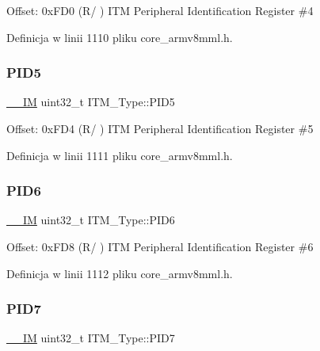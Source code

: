 Offset\+: 0x\+F\+D0 (R/ ) I\+TM Peripheral Identification Register \#4 

Definicja w linii 1110 pliku core\+\_\+armv8mml.\+h.

\mbox{\label{struct_i_t_m___type_af9085648bf18f69b5f9d1136d45e1d37}} 
\subsubsection{\texorpdfstring{P\+I\+D5}{PID5}}
{\footnotesize\ttfamily \hyperlink{core__sc300_8h_a4cc1649793116d7c2d8afce7a4ffce43}{\+\_\+\+\_\+\+IM} uint32\+\_\+t I\+T\+M\+\_\+\+Type\+::\+P\+I\+D5}

Offset\+: 0x\+F\+D4 (R/ ) I\+TM Peripheral Identification Register \#5 

Definicja w linii 1111 pliku core\+\_\+armv8mml.\+h.

\mbox{\label{struct_i_t_m___type_ad34dbe6b1072c77d36281049c8b169f6}} 
\subsubsection{\texorpdfstring{P\+I\+D6}{PID6}}
{\footnotesize\ttfamily \hyperlink{core__sc300_8h_a4cc1649793116d7c2d8afce7a4ffce43}{\+\_\+\+\_\+\+IM} uint32\+\_\+t I\+T\+M\+\_\+\+Type\+::\+P\+I\+D6}

Offset\+: 0x\+F\+D8 (R/ ) I\+TM Peripheral Identification Register \#6 

Definicja w linii 1112 pliku core\+\_\+armv8mml.\+h.

\mbox{\label{struct_i_t_m___type_a2bcec6803f28f30d5baf5e20e3517d3d}} 
\subsubsection{\texorpdfstring{P\+I\+D7}{PID7}}
{\footnotesize\ttfamily \hyperlink{core__sc300_8h_a4cc1649793116d7c2d8afce7a4ffce43}{\+\_\+\+\_\+\+IM} uint32\+\_\+t I\+T\+M\+\_\+\+Type\+::\+P\+I\+D7}

